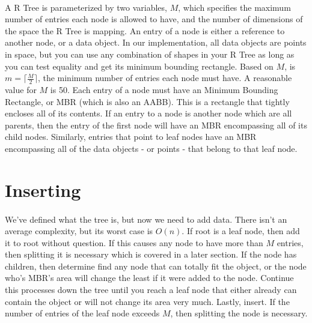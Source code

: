 \documentclass{article}
\begin{document}
\begin{multicols}{2}[]
\paragraph{}
A R Tree is parameterized by two variables, $M$, which specifies the maximum number of entries each node is allowed to have, and
 the number of dimensions of the space the R Tree is mapping. An entry of a node is either a reference
to another node, or a data object. In our implementation, all data objects are points in space, but you can use any combination
 of shapes in your R Tree as long as you can test equality and get its minimum bounding rectangle.
Based on $M$, is $m = \lceil\frac{M}{2}\rceil$, the minimum number of entries each node must have. A reasonable value for $M$ is 50.
 \cite{guttman_1984_rtrees} Each entry of a node must have an Minimum Bounding Rectangle,
or MBR (which is also an AABB). This is a rectangle that tightly encloses all of its contents. If an entry to a node is another node
which are all parents, then the entry of the first node will have an MBR encompassing all of its child nodes.
Similarly, entries that point to leaf nodes have an MBR encompassing all of the data objects - or points - that belong to that leaf node.

\section{Inserting}
\paragraph{}
We've defined what the tree is, but now we need to add data. There isn't an average complexity, but its worst
case is $O(n)$. If root is a leaf node, then add it to root without question. If this causes any node to have
 more than $M$ entries, then splitting it is necessary
which is covered in a later section. If the node has children, then determine find any node that can totally
fit the object, or the node who's MBR's area will change the least if it were added to the node. Continue this
processes down the tree until you reach a leaf node that either already can contain the object or will not change
its area very much. Lastly, insert. If the number of entries of the leaf node exceeds $M$, then splitting the
node is necessary.


\end{multicols}
\end{document}
